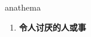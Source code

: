 
\begin{frame}
{\huge anathema}
\begin{center}
\begin{enumerate}\Large
  \item \textbf{令人讨厌的人或事}
\end{enumerate}
\end{center}
\end{frame}
